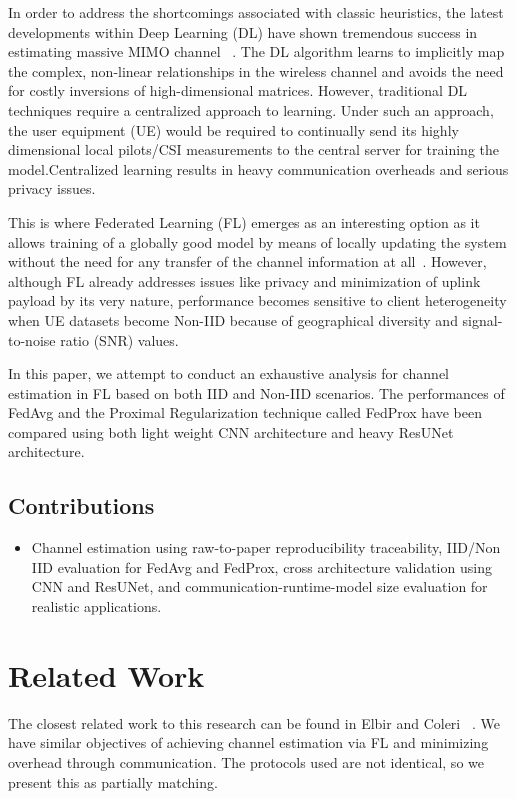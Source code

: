 \documentclass{llncs}
\begin{document}
In order to address the shortcomings associated with classic heuristics, the latest developments within Deep Learning (DL) have shown tremendous success in estimating massive MIMO channel ~\cite{wen2018deep, he2018deep, ye2018power, soltani2019deep}. The DL algorithm learns to implicitly
map the complex, non-linear relationships in the wireless channel and avoids the need for costly inversions of high-dimensional matrices. However, traditional DL techniques require a centralized approach to learning. Under such an approach, the user equipment (UE) would be required to continually send its highly dimensional local pilots/CSI measurements to the central server for training the model.Centralized learning results in heavy communication overheads and serious privacy issues.

This is where Federated Learning (FL) emerges as an interesting option as it allows training of a globally good model by means of locally updating the system without the need for any transfer of the channel information at all~\cite{kairouz2021survey, ghosh2019robust}. However, although FL already addresses issues like privacy and minimization of uplink payload by its very nature, performance becomes sensitive to client heterogeneity when UE datasets become Non-IID because of geographical diversity and signal-to-noise ratio (SNR)  values.

In this paper, we attempt to conduct an exhaustive analysis for channel estimation in FL based on both IID and Non-IID scenarios. The performances of FedAvg and the Proximal Regularization technique called FedProx have been compared using both light weight CNN architecture and heavy ResUNet architecture.

\subsection{Contributions}
\begin{itemize}
    \item Channel estimation using raw-to-paper reproducibility traceability, IID/Non IID evaluation for FedAvg and FedProx, cross architecture validation using CNN and ResUNet, and communication-runtime-model size evaluation for realistic applications.
\end{itemize}

\section{Related Work}
The closest related work to this research can be found in Elbir and Coleri ~\cite{elbir2021flchannel}. We have similar objectives of achieving channel estimation via FL and minimizing overhead through communication. The protocols used are not identical, so we present this as partially matching.
\end{document}

